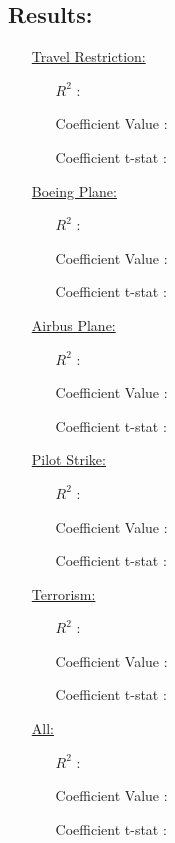 \documentclass[12pt]{report}
\begin{document}
\subsection*{Results:}
\begin{enumerate}
    \item[\underline{Travel Restriction:}]
        \begin{enumerate}
            \item[$R^2$]:
            \item[Coefficient Value]:
            \item[Coefficient t-stat]:
        \end{enumerate}
    \item[\underline{Boeing Plane:}]
        \begin{enumerate}
            \item[$R^2$]:
            \item[Coefficient Value]:
            \item[Coefficient t-stat]:
        \end{enumerate}
    \item[\underline{Airbus Plane:}]
        \begin{enumerate}
            \item[$R^2$]:
            \item[Coefficient Value]:
            \item[Coefficient t-stat]:
        \end{enumerate}
    \item[\underline{Pilot Strike:}]
        \begin{enumerate}
            \item[$R^2$]:
            \item[Coefficient Value]:
            \item[Coefficient t-stat]:
        \end{enumerate}
    \item[\underline{Terrorism:}]
        \begin{enumerate}
            \item[$R^2$]:
            \item[Coefficient Value]:
            \item[Coefficient t-stat]:
        \end{enumerate}
    \item[\underline{All:}]
        \begin{enumerate}
            \item[$R^2$]:
            \item[Coefficient Value]:
            \item[Coefficient t-stat]:
        \end{enumerate}
\end{enumerate}
\end{document}
